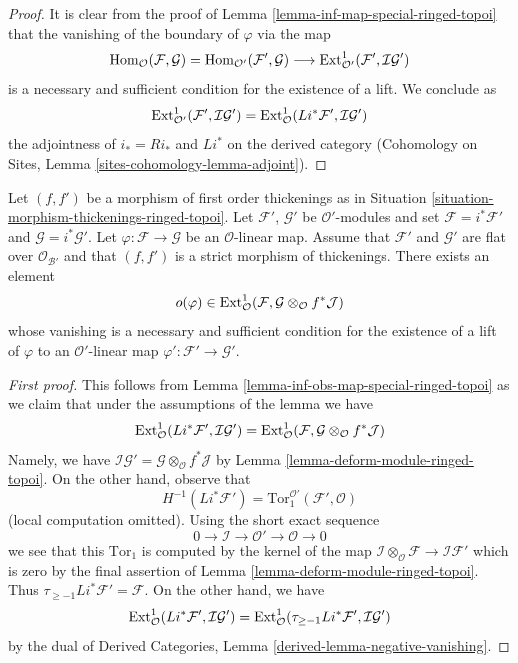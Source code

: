\begin{proof}
It is clear from the proof of Lemma \ref{lemma-inf-map-special-ringed-topoi}
that the vanishing of the boundary of $\varphi$ via the map
$$
\mathop{\mathrm{Hom}}\nolimits_\mathcal{O}(\mathcal{F}, \mathcal{G}) =
\mathop{\mathrm{Hom}}\nolimits_{\mathcal{O}'}(\mathcal{F}', \mathcal{G}) \longrightarrow
\mathop{\mathrm{Ext}}\nolimits^1_{\mathcal{O}'}(\mathcal{F}', \mathcal{I}\mathcal{G}')
$$
is a necessary and sufficient condition for the existence of a lift. We
conclude as
$$
\mathop{\mathrm{Ext}}\nolimits^1_{\mathcal{O}'}(\mathcal{F}', \mathcal{I}\mathcal{G}') =
\mathop{\mathrm{Ext}}\nolimits^1_\mathcal{O}(Li^*\mathcal{F}', \mathcal{I}\mathcal{G}')
$$
the adjointness of $i_* = Ri_*$ and $Li^*$ on the derived category
(Cohomology on Sites, Lemma \ref{sites-cohomology-lemma-adjoint}).
\end{proof}

\begin{lemma}
\label{lemma-inf-obs-map-rel-ringed-topoi}
Let $(f, f')$ be a morphism of first order thickenings as in
Situation \ref{situation-morphism-thickenings-ringed-topoi}.
Let $\mathcal{F}'$, $\mathcal{G}'$ be $\mathcal{O}'$-modules and set
$\mathcal{F} = i^*\mathcal{F}'$ and $\mathcal{G} = i^*\mathcal{G}'$.
Let $\varphi : \mathcal{F} \to \mathcal{G}$ be an $\mathcal{O}$-linear map.
Assume that $\mathcal{F}'$ and $\mathcal{G}'$ are flat over
$\mathcal{O}_{\mathcal{B}'}$ and
that $(f, f')$ is a strict morphism of thickenings. There exists an element
$$
o(\varphi) \in
\mathop{\mathrm{Ext}}\nolimits^1_\mathcal{O}(\mathcal{F},
\mathcal{G} \otimes_\mathcal{O} f^*\mathcal{J})
$$
whose vanishing is a necessary and sufficient condition for the
existence of a lift of $\varphi$ to an $\mathcal{O}'$-linear map
$\varphi' : \mathcal{F}' \to \mathcal{G}'$.
\end{lemma}

\begin{proof}[First proof]
This follows from Lemma \ref{lemma-inf-obs-map-special-ringed-topoi}
as we claim that under the assumptions of the lemma we have
$$
\mathop{\mathrm{Ext}}\nolimits^1_\mathcal{O}(Li^*\mathcal{F}', \mathcal{I}\mathcal{G}') =
\mathop{\mathrm{Ext}}\nolimits^1_\mathcal{O}(\mathcal{F},
\mathcal{G} \otimes_\mathcal{O} f^*\mathcal{J})
$$
Namely, we have
$\mathcal{I}\mathcal{G}' =
\mathcal{G} \otimes_\mathcal{O} f^*\mathcal{J}$
by Lemma \ref{lemma-deform-module-ringed-topoi}.
On the other hand, observe that
$$
H^{-1}(Li^*\mathcal{F}') =
\text{Tor}_1^{\mathcal{O}'}(\mathcal{F}', \mathcal{O})
$$
(local computation omitted). Using the short exact sequence
$$
0 \to \mathcal{I} \to \mathcal{O}' \to \mathcal{O} \to 0
$$
we see that this $\text{Tor}_1$ is computed by the kernel of the map
$\mathcal{I} \otimes_\mathcal{O} \mathcal{F} \to \mathcal{I}\mathcal{F}'$
which is zero by the final assertion of
Lemma \ref{lemma-deform-module-ringed-topoi}.
Thus $\tau_{\geq -1}Li^*\mathcal{F}' = \mathcal{F}$.
On the other hand, we have
$$
\mathop{\mathrm{Ext}}\nolimits^1_\mathcal{O}(Li^*\mathcal{F}',
\mathcal{I}\mathcal{G}') =
\mathop{\mathrm{Ext}}\nolimits^1_\mathcal{O}(\tau_{\geq -1}Li^*\mathcal{F}',
\mathcal{I}\mathcal{G}')
$$
by the dual of
Derived Categories, Lemma \ref{derived-lemma-negative-vanishing}.
\end{proof}

